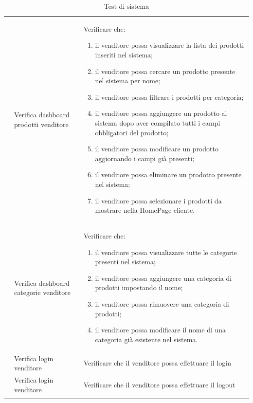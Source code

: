 \begin{center}
\begin{longtable}{|p{1cm}|p{4.85cm}|p{9cm}|}
		 & Verifica dashboard prodotti venditore & Verificare che:
		\begin{enumerate}
			\item il venditore possa visualizzare la lista dei prodotti inseriti nel sistema;
			\item il venditore possa cercare un prodotto presente nel sistema per nome;
			\item il venditore possa filtrare i prodotti per categoria;
			\item il venditore possa aggiungere un prodotto al sistema dopo aver compilato tutti i campi obbligatori del prodotto;
			\item il venditore possa modificare un prodotto aggiornando i campi già presenti;
			\item il venditore possa eliminare un prodotto presente nel sistema;
			\item il venditore possa selezionare i prodotti da mostrare nella HomePage cliente.
		\end{enumerate} \\

		 & Verifica dashboard categorie venditore & Verificare che:
		\begin{enumerate}
			\item il venditore possa visualizzare tutte le categorie presenti nel sistema;
			\item il venditore possa aggiungere una categoria di prodotti impostando il nome;
			\item il venditore possa rimuovere una categoria di prodotti;
			\item il venditore possa modificare il nome di una categoria già esistente nel sistema.
		\end{enumerate} \\

		 & Verifica login venditore & Verificare che il venditore possa effettuare il login \\

		 & Verifica login venditore & Verificare che il venditore possa effettuare il logout \\

		\hline
		\caption{Test di sistema}
	\end{longtable}
\end{center}


